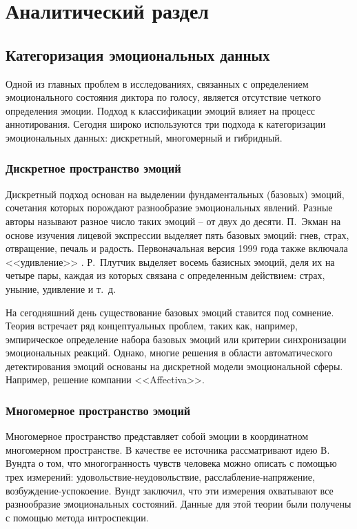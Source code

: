 \chapter{Аналитический раздел}
\section{Категоризация эмоциональных данных}
Одной из главных проблем в исследованиях, связанных с определением эмоционального состояния диктора по голосу, является отсутствие четкого определения эмоции. Подход к классификации эмоций влияет на процесс аннотирования. Сегодня широко используются три подхода к категоризации эмоциональных данных: дискретный, многомерный и гибридный.
\subsection{Дискретное пространство эмоций}
Дискретный подход основан на выделении фундаментальных (базовых) эмоций, сочетания которых порождают разнообразие эмоциональных явлений. Разные авторы называют разное число таких эмоций -- от двух до десяти. П.~Экман на основе изучения лицевой экспрессии выделяет пять базовых эмоций: гнев, страх, отвращение, печаль и радость. Первоначальная версия 1999 года также включала <<удивление>> \cite{Ekman1972, Ekman1992}. Р.~Плутчик \cite{Plutchik1980} выделяет восемь базисных эмоций, деля их на четыре пары, каждая из которых связана с определенным действием: страх, уныние, удивление и т.~д. 


На сегодняшний день существование базовых эмоций ставится под сомнение. Теория встречает ряд концептуальных проблем, таких как, например, эмпирическое определение набора базовых эмоций или критерии синхронизации эмоциональных реакций. Однако, многие решения в области автоматического детектирования эмоций основаны на дискретной модели эмоциональной сферы. Например, решение компании <<Affectiva>>. \cite{Affectica}

\subsection{Многомерное пространство эмоций}
Многомерное пространство представляет собой эмоции в координатном многомерном пространстве. В качестве ее источника рассматривают идею В. Вундта о том, что многогранность чувств
человека можно описать с помощью трех измерений: удовольствие-неудовольствие, расслабление-напряжение, возбуждение-успокоение. Вундт заключил, \cite{Вундт1984} что эти измерения охватывают все разнообразие эмоциональных состояний. Данные для этой теории были получены с помощью метода интроспекции.

